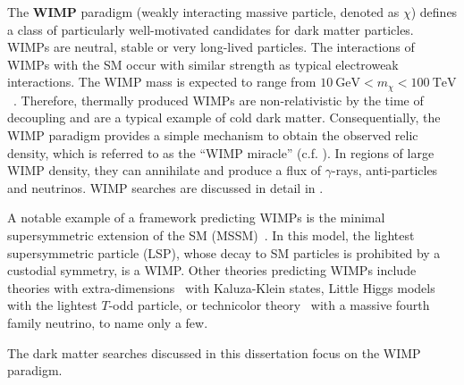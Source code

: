The \textbf{WIMP} paradigm (weakly interacting massive particle, denoted as \(\chi\)) defines a class of particularly well-motivated candidates for dark matter particles. WIMPs are neutral, stable or very long-lived particles. The interactions of WIMPs with the SM occur with similar strength as typical electroweak interactions. The WIMP mass is expected to range from \(\SI{10}{\giga\electronvolt} < m_{\chi} < \SI{100}{\tera\electronvolt}\)~\cite{Kolb1990,Griest1990}. Therefore, thermally produced WIMPs are non-relativistic by the time of decoupling and are a typical example of cold dark matter. Consequentially, the WIMP paradigm provides a simple mechanism to obtain the observed relic density, which is referred to as the ``WIMP miracle'' (c.f. ).
In regions of large WIMP density, they can annihilate and produce a flux of \(\gamma\)-rays, anti-particles and neutrinos. WIMP searches are discussed in detail in .

A notable example of a framework predicting WIMPs is the minimal supersymmetric extension of the SM (MSSM)~\cite{Fox2019}. In this model, the lightest supersymmetric particle (LSP), whose decay to SM particles is prohibited by a custodial symmetry, is a WIMP. Other theories predicting WIMPs include theories with extra-dimensions~\cite{Cheng2002} with Kaluza-Klein states, Little Higgs models~\cite{Birkedal2006} with the lightest \(T\)-odd particle, or technicolor theory~\cite{Kainulainen2007} with a massive fourth family neutrino, to name only a few.

The dark matter searches discussed in this dissertation focus on the WIMP paradigm.


